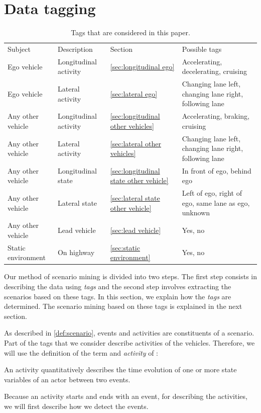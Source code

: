\section{Data tagging}
\label{sec:tagging}

\begin{table}
	\cstarta
	\centering
	\caption{\cstarta Tags that are considered in this paper.\cenda}
	\label{tab:tags}
	\begin{tabular}{llll}
		\toprule
		Subject & Description & Section & Possible tags \\ \otoprule
		Ego vehicle & Longitudinal activity & \cref{sec:longitudinal ego} & Accelerating, decelerating, cruising \\
		Ego vehicle & Lateral activity & \cref{sec:lateral ego} & Changing lane left, changing lane right, following lane \\
		Any other vehicle & Longitudinal activity & \cref{sec:longitudinal other vehicles} & Accelerating, braking, cruising \\
		Any other vehicle & Lateral activity & \cref{sec:lateral other vehicles} & Changing lane left, changing lane right, following lane \\
		Any other vehicle & Longitudinal state & \cref{sec:longitudinal state other vehicle} & In front of ego, behind ego \\
		Any other vehicle & Lateral state & \cref{sec:lateral state other vehicle} & Left of ego, right of ego, same lane as ego, unknown \\
		Any other vehicle & Lead vehicle & \cref{sec:lead vehicle} & Yes, no \\
		Static environment & On highway & \cref{sec:static environment} & Yes, no \\ 
		\bottomrule
	\end{tabular}
	\cenda
\end{table}

\cstarta
Our method of scenario mining is divided into two steps. 
The first step consists in describing the data using \emph{tags} and the second step involves extracting the scenarios based on these tags. 
In this section, we explain how the \emph{tags} are determined. 
The scenario mining based on these tags is explained in the next section.

As described in \cref{def:scenario}, events and activities are constituents of a scenario. 
Part of the tags that we consider describe activities of the vehicles.
Therefore, we will use the definition of the term and \emph{activity} of \autocite{degelder2018ontology}:\cenda
\begin{definition}
	\label{def:activity}
	An activity quantitatively describes the time evolution of one or more state variables of an actor between two events.
\end{definition}
Because an activity starts and ends with an event, for describing the activities, we will first describe how we detect the events.


